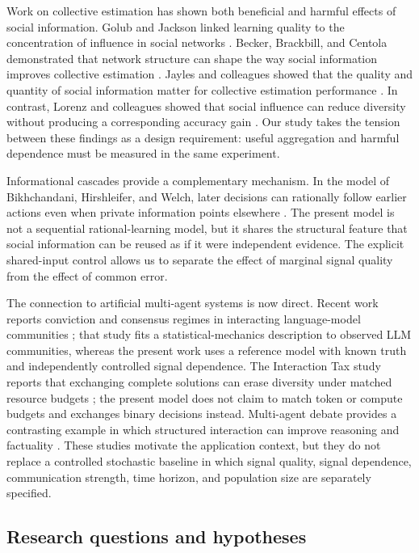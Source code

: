 \documentclass[11pt,a4paper]{article}
\begin{document}
Work on collective estimation has shown both beneficial and harmful effects of social information. Golub and Jackson linked learning quality to the concentration of influence in social networks \citep{golub_jackson2010}. Becker, Brackbill, and Centola demonstrated that network structure can shape the way social information improves collective estimation \citep{becker2017}. Jayles and colleagues showed that the quality and quantity of social information matter for collective estimation performance \citep{jayles2017}. In contrast, Lorenz and colleagues showed that social influence can reduce diversity without producing a corresponding accuracy gain \citep{lorenz2011}. Our study takes the tension between these findings as a design requirement: useful aggregation and harmful dependence must be measured in the same experiment.

Informational cascades provide a complementary mechanism. In the model of Bikhchandani, Hirshleifer, and Welch, later decisions can rationally follow earlier actions even when private information points elsewhere \citep{bikhchandani1992}. The present model is not a sequential rational-learning model, but it shares the structural feature that social information can be reused as if it were independent evidence. The explicit shared-input control allows us to separate the effect of marginal signal quality from the effect of common error.

The connection to artificial multi-agent systems is now direct. Recent work reports conviction and consensus regimes in interacting language-model communities \citep{physics_of_agents_2026}; that study fits a statistical-mechanics description to observed LLM communities, whereas the present work uses a reference model with known truth and independently controlled signal dependence. The Interaction Tax study reports that exchanging complete solutions can erase diversity under matched resource budgets \citep{interaction_tax_2026}; the present model does not claim to match token or compute budgets and exchanges binary decisions instead. Multi-agent debate provides a contrasting example in which structured interaction can improve reasoning and factuality \citep{du_et_al_2023}. These studies motivate the application context, but they do not replace a controlled stochastic baseline in which signal quality, signal dependence, communication strength, time horizon, and population size are separately specified.

\subsection{Research questions and hypotheses}
\end{document}
